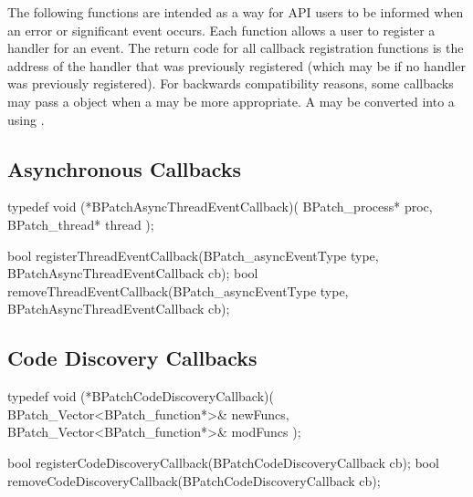 The following functions are intended as a way for API users to be
informed when an error or significant event occurs.
Each function allows a user to register a handler for an event. The
return code for all callback registration
functions is the address of the handler that was previously
registered (which may be  if no handler was previously
registered). For backwards compatibility reasons, some callbacks may
pass a  object when a
 may be more appropriate. A
 may be converted into a  using
.

\subsection{Asynchronous Callbacks}

\begin{apient}
  typedef void (*BPatchAsyncThreadEventCallback)(
    BPatch_process* proc,
    BPatch_thread* thread
  );

  bool registerThreadEventCallback(BPatch_asyncEventType type,
                                   BPatchAsyncThreadEventCallback cb);
  bool removeThreadEventCallback(BPatch_asyncEventType type,
                                 BPatchAsyncThreadEventCallback cb);
\end{apient}


\subsection{Code Discovery Callbacks}

\begin{apient}
  typedef void (*BPatchCodeDiscoveryCallback)(
    BPatch_Vector<BPatch_function*>& newFuncs,
    BPatch_Vector<BPatch_function*>& modFuncs
  );

  bool registerCodeDiscoveryCallback(BPatchCodeDiscoveryCallback cb);
  bool removeCodeDiscoveryCallback(BPatchCodeDiscoveryCallback cb);
\end{apient}


